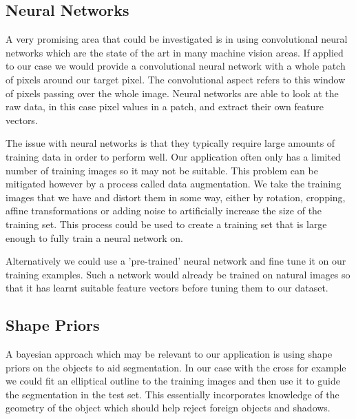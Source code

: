 \documentclass[12pt]{IIBproject}
\begin{document}
\subsection{Neural Networks}
A very promising area that could be investigated is in using convolutional neural networks which are the state of the art in many machine vision areas\cite{imageNet}. If applied to our case we would provide a convolutional neural network with a whole patch of pixels around our target pixel. The convolutional aspect refers to this window of pixels passing over the whole image. Neural networks are able to look at the raw data, in this case pixel values in a patch, and extract their own feature vectors. 

The issue with neural networks is that they typically require large amounts of training data in order to perform well. Our application often only has a limited number of training images so it may not be suitable. This problem can be mitigated however by a process called data augmentation. We take the training images that we have and distort them in some way, either by rotation, cropping, affine transformations or adding noise to artificially increase the size of the training set. This process could be used to create a training set that is large enough to fully train a neural network on.

 Alternatively we could use a 'pre-trained' neural network and fine tune it on our training examples. Such a network would already be trained on natural images so that it has learnt suitable feature vectors before tuning them to our dataset.
\subsection{Shape Priors}
A bayesian approach which may be relevant to our application is using shape priors on the objects to aid segmentation\cite{chang2008bayesian}. In our case with the cross for example we could fit an elliptical outline to the training images and then use it to guide the segmentation in the test set. This essentially incorporates knowledge of the geometry of the object which should help reject foreign objects and shadows. 

\newpage

\end{document}
